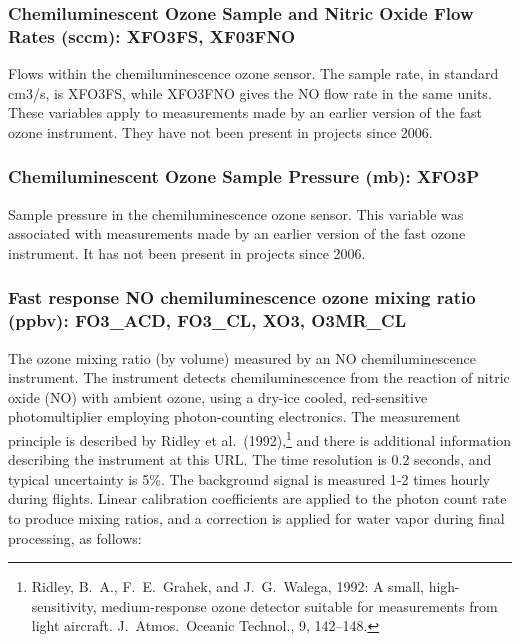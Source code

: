 \documentclass[
  english,
]{book}
\begin{document}
\hypertarget{xfo3fs}{%
\subsubsection*{Chemiluminescent Ozone Sample and Nitric Oxide Flow
Rates (sccm): XFO3FS, XF03FNO}\label{xfo3fs}}

Flows within the chemiluminescence ozone sensor. The sample rate, in
standard {cm3/s}, is XFO3FS, while XFO3FNO gives the NO flow rate in the
same units. These variables apply to measurements made by an earlier
version of the fast ozone instrument. They have not been present in
projects since 2006.

\hypertarget{xfo3p}{%
\subsubsection*{Chemiluminescent Ozone Sample Pressure (mb):
XFO3P}\label{xfo3p}}

Sample pressure in the chemiluminescence ozone sensor. This variable was
associated with measurements made by an earlier version of the fast
ozone instrument. It has not been present in projects since 2006.

\hypertarget{fo3-acd}{%
\subsubsection*{Fast response NO chemiluminescence ozone mixing ratio
(ppbv): FO3\_ACD, FO3\_CL, XO3, O3MR\_CL}\label{fo3-acd}}

The ozone mixing ratio (by volume) measured by an NO chemiluminescence
instrument. The instrument detects chemiluminescence from the reaction
of nitric oxide (NO) with ambient ozone, using a dry-ice cooled,
red-sensitive photomultiplier employing photon-counting electronics. The
measurement principle is described by Ridley et al.~(1992),\footnote{Ridley,
  B.~A., F.~E.~Grahek, and J.~G.~Walega, 1992: A small,
  high-sensitivity, medium-response ozone detector suitable for
  measurements from light aircraft. J.~Atmos.~Oceanic Technol., 9,
  142--148.} and there is additional information describing the
instrument at this URL. The time resolution is 0.2 seconds, and typical
uncertainty is 5\%. The background signal is measured 1-2 times hourly
during flights. Linear calibration coefficients are applied to the
photon count rate to produce mixing ratios, and a correction is applied
for water vapor during final processing, as follows:
\end{document}
